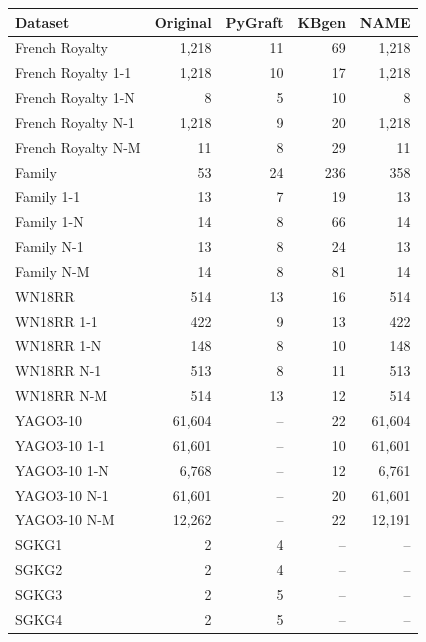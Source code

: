 \begin{tabular}{lrrrr}
\toprule
Dataset & Original & PyGraft & KBgen & NAME \\
\midrule
French Royalty & 1{,}218 & 11 & 69 & 1{,}218 \\
French Royalty 1-1 & 1{,}218 & 10 & 17 & 1{,}218 \\
French Royalty 1-N & 8 & 5 & 10 & 8 \\
French Royalty N-1 & 1{,}218 & 9 & 20 & 1{,}218 \\
French Royalty N-M & 11 & 8 & 29 & 11 \\
\midrule
Family & 53 & 24 & 236 & 358 \\
Family 1-1 & 13 & 7 & 19 & 13 \\
Family 1-N & 14 & 8 & 66 & 14 \\
Family N-1 & 13 & 8 & 24 & 13 \\
Family N-M & 14 & 8 & 81 & 14 \\
\midrule
WN18RR & 514 & 13 & 16 & 514 \\
WN18RR 1-1 & 422 & 9 & 13 & 422 \\
WN18RR 1-N & 148 & 8 & 10 & 148 \\
WN18RR N-1 & 513 & 8 & 11 & 513 \\
WN18RR N-M & 514 & 13 & 12 & 514 \\
\midrule
YAGO3-10 & 61{,}604 & – & 22 & 61{,}604 \\
YAGO3-10 1-1 & 61{,}601 & – & 10 & 61{,}601 \\
YAGO3-10 1-N & 6{,}768 & – & 12 & 6{,}761 \\
YAGO3-10 N-1 & 61{,}601 & – & 20 & 61{,}601 \\
YAGO3-10 N-M & 12{,}262 & – & 22 & 12{,}191 \\
\midrule
SGKG1 & 2 & 4 & – & – \\
SGKG2 & 2 & 4 & – & – \\
SGKG3 & 2 & 5 & – & – \\
SGKG4 & 2 & 5 & – & – \\
\bottomrule
\end{tabular}
